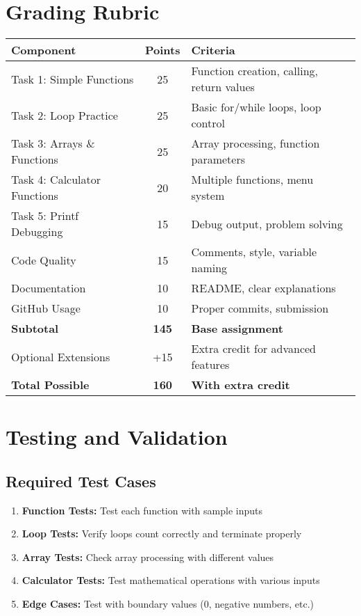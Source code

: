 \documentclass[11pt,a4paper]{article}
\begin{document}
\section{Grading Rubric}

\begin{center}
\begin{tabular}{|l|c|l|}
\hline
\textbf{Component} & \textbf{Points} & \textbf{Criteria} \\
\hline
Task 1: Simple Functions & 25 & Function creation, calling, return values \\
Task 2: Loop Practice & 25 & Basic for/while loops, loop control \\
Task 3: Arrays \& Functions & 25 & Array processing, function parameters \\
Task 4: Calculator Functions & 20 & Multiple functions, menu system \\
Task 5: Printf Debugging & 15 & Debug output, problem solving \\
Code Quality & 15 & Comments, style, variable naming \\
Documentation & 10 & README, clear explanations \\
GitHub Usage & 10 & Proper commits, submission \\
\hline
\textbf{Subtotal} & \textbf{145} & \textbf{Base assignment} \\
\hline
Optional Extensions & +15 & Extra credit for advanced features \\
\hline
\textbf{Total Possible} & \textbf{160} & \textbf{With extra credit} \\
\hline
\end{tabular}
\end{center}

\section{Testing and Validation}

\subsection{Required Test Cases}
\begin{enumerate}
    \item \textbf{Function Tests:} Test each function with sample inputs
    \item \textbf{Loop Tests:} Verify loops count correctly and terminate properly
    \item \textbf{Array Tests:} Check array processing with different values
    \item \textbf{Calculator Tests:} Test mathematical operations with various inputs
    \item \textbf{Edge Cases:} Test with boundary values (0, negative numbers, etc.)
\end{enumerate}
\end{document}
